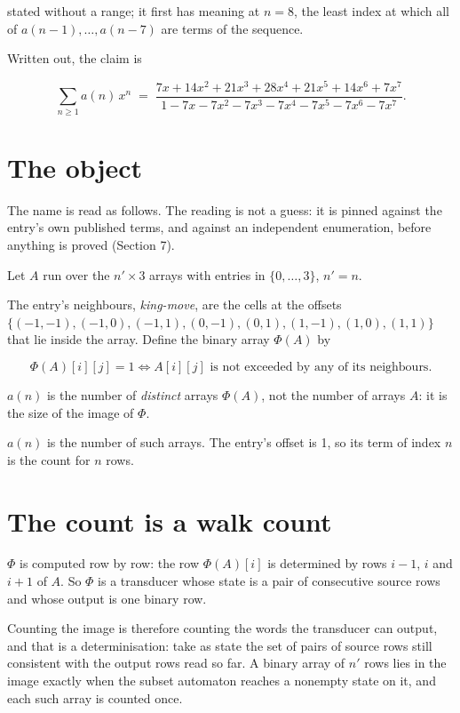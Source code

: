 \documentclass[11pt]{article}
\theoremstyle{definition}
\begin{document}
stated without a range; it first has meaning at $n = 8$, the least index at which all of $a(n-1),\dots,a(n-7)$ are terms of the sequence.

Written out, the claim is

\[\sum_{n \ge 1} a(n)\,x^n \;=\; \frac{7x + 14x^{2} + 21x^{3} + 28x^{4} + 21x^{5} + 14x^{6} + 7x^{7}}{1 - 7x - 7x^{2} - 7x^{3} - 7x^{4} - 7x^{5} - 7x^{6} - 7x^{7}}.\]

\section{The object}

The name is read as follows. The reading is not a guess: it is pinned against the entry's own published terms, and against an independent enumeration, before anything is proved (Section 7).

Let $A$ run over the $n' \times 3$ arrays with entries in $\{0,\dots,3\}$, $n' = n$.

The entry's neighbours, {\itshape king-move}, are the cells at the offsets $\{(-1,-1), (-1,0), (-1,1), (0,-1), (0,1), (1,-1), (1,0), (1,1)\}$ that lie inside the array. Define the binary array $\Phi(A)$ by

\[\Phi(A)[i][j] = 1 \iff A[i][j] \text{ is not exceeded by any of its neighbours}.\]

$a(n)$ is the number of {\itshape distinct} arrays $\Phi(A)$, not the number of arrays $A$: it is the size of the image of $\Phi$.

$a(n)$ is the number of such arrays. The entry's offset is 1, so its term of index $n$ is the count for $n$ rows.

\section{The count is a walk count}

$\Phi$ is computed row by row: the row $\Phi(A)[i]$ is determined by rows $i-1$, $i$ and $i+1$ of $A$. So $\Phi$ is a transducer whose state is a pair of consecutive source rows and whose output is one binary row.

Counting the image is therefore counting the words the transducer can output, and that is a determinisation: take as state the set of pairs of source rows still consistent with the output rows read so far. A binary array of $n'$ rows lies in the image exactly when the subset automaton reaches a nonempty state on it, and each such array is counted once.
\end{document}

